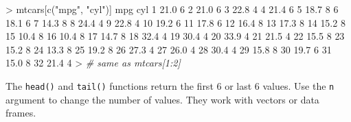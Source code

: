 \documentclass[
]{book}
\newenvironment{Shaded}{\begin{snugshade}}{\end{snugshade}}
\newcommand{\CommentTok}[1]{\textcolor[rgb]{0.56,0.35,0.01}{\textit{#1}}}
\newcommand{\DecValTok}[1]{\textcolor[rgb]{0.00,0.00,0.81}{#1}}
\newcommand{\ErrorTok}[1]{\textcolor[rgb]{0.64,0.00,0.00}{\textbf{#1}}}
\newcommand{\FloatTok}[1]{\textcolor[rgb]{0.00,0.00,0.81}{#1}}
\newcommand{\FunctionTok}[1]{\textcolor[rgb]{0.00,0.00,0.00}{#1}}
\newcommand{\NormalTok}[1]{#1}
\newcommand{\SpecialCharTok}[1]{\textcolor[rgb]{0.00,0.00,0.00}{#1}}
\newcommand{\StringTok}[1]{\textcolor[rgb]{0.31,0.60,0.02}{#1}}
\begin{document}
\begin{Shaded}
\begin{Highlighting}[]
\SpecialCharTok{\textgreater{}}\NormalTok{ mtcars[}\FunctionTok{c}\NormalTok{(}\StringTok{"mpg"}\NormalTok{, }\StringTok{"cyl"}\NormalTok{)] }
\NormalTok{    mpg cyl}
\DecValTok{1}  \FloatTok{21.0}   \DecValTok{6}
\DecValTok{2}  \FloatTok{21.0}   \DecValTok{6}
\DecValTok{3}  \FloatTok{22.8}   \DecValTok{4}
\DecValTok{4}  \FloatTok{21.4}   \DecValTok{6}
\DecValTok{5}  \FloatTok{18.7}   \DecValTok{8}
\DecValTok{6}  \FloatTok{18.1}   \DecValTok{6}
\DecValTok{7}  \FloatTok{14.3}   \DecValTok{8}
\DecValTok{8}  \FloatTok{24.4}   \DecValTok{4}
\DecValTok{9}  \FloatTok{22.8}   \DecValTok{4}
\DecValTok{10} \FloatTok{19.2}   \DecValTok{6}
\DecValTok{11} \FloatTok{17.8}   \DecValTok{6}
\DecValTok{12} \FloatTok{16.4}   \DecValTok{8}
\DecValTok{13} \FloatTok{17.3}   \DecValTok{8}
\DecValTok{14} \FloatTok{15.2}   \DecValTok{8}
\DecValTok{15} \FloatTok{10.4}   \DecValTok{8}
\DecValTok{16} \FloatTok{10.4}   \DecValTok{8}
\DecValTok{17} \FloatTok{14.7}   \DecValTok{8}
\DecValTok{18} \FloatTok{32.4}   \DecValTok{4}
\DecValTok{19} \FloatTok{30.4}   \DecValTok{4}
\DecValTok{20} \FloatTok{33.9}   \DecValTok{4}
\DecValTok{21} \FloatTok{21.5}   \DecValTok{4}
\DecValTok{22} \FloatTok{15.5}   \DecValTok{8}
\DecValTok{23} \FloatTok{15.2}   \DecValTok{8}
\DecValTok{24} \FloatTok{13.3}   \DecValTok{8}
\DecValTok{25} \FloatTok{19.2}   \DecValTok{8}
\DecValTok{26} \FloatTok{27.3}   \DecValTok{4}
\DecValTok{27} \FloatTok{26.0}   \DecValTok{4}
\DecValTok{28} \FloatTok{30.4}   \DecValTok{4}
\DecValTok{29} \FloatTok{15.8}   \DecValTok{8}
\DecValTok{30} \FloatTok{19.7}   \DecValTok{6}
\DecValTok{31} \FloatTok{15.0}   \DecValTok{8}
\DecValTok{32} \FloatTok{21.4}   \DecValTok{4}
\SpecialCharTok{\textgreater{}} \CommentTok{\# same as mtcars[1:2] }
\end{Highlighting}
\end{Shaded}

The \texttt{head()} and \texttt{tail()} functions return the first 6 or last 6 values. Use the \texttt{n} argument to change the number of values. They work with vectors or data frames.

\begin{Shaded}
\end{Shaded}
\end{document}
